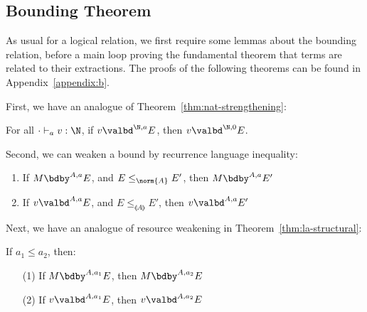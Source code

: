 \subsection{Bounding Theorem}

As usual for a logical relation, we first require some lemmas about the
bounding relation, before a main loop proving the fundamental theorem
that terms are related to their extractions.  The proofs of the following
theorems can be found
in Appendix~\ref{appendix:b}.%

First, we have an analogue of Theorem~\ref{thm:nat-strengthening}:

\begin{theorem}[$\N$-strengthening]
For all $\cdot \vdash_a v : \N$, if $v \valbd^{\N,a} E$, then $v \valbd^{\N,0} E$.
\end{theorem}

Second, we can weaken a bound by recurrence language inequality:

\begin{theorem}[Weakening] \hfill
\label{thm:weakening}
\begin{enumerate}
    \item If $M \bdby^{A,a} E$, and $E \leq_{\norm{A}} E'$, then $M \bdby^{A,a} E'$
    \item If $v \valbd^{A,a} E$, and $E \leq_{\llangle A \rrangle} E'$, then $v \valbd^{A,a} E'$
\end{enumerate}
\end{theorem}

Next, we have an analogue of resource weakening in
Theorem~\ref{thm:la-structural}:

\begin{theorem}
If $a_1 \leq a_2$, then:
\begin{enumerate}
  \item[(1)] If $M \bdby^{A,a_1} E$, then $M \bdby^{A,a_2} E$
  \item[(2)] If $v \valbd^{A,a_1} E$, then $v \valbd^{A,a_2} E$ 
\end{enumerate}
\end{theorem}

